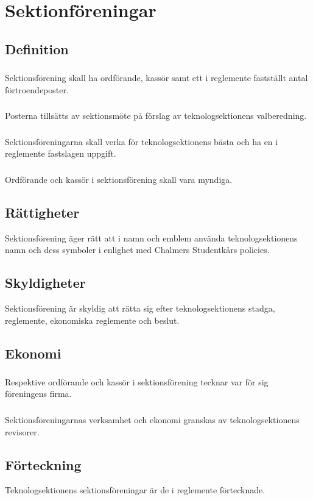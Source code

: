 \section{Sektionföreningar}
\subsection{Definition}
\subsubsection{}
Sektionsförening skall ha ordförande, kassör samt ett i reglemente fastställt antal förtroendeposter.
\subsubsection{}
Posterna tillsätts av sektionsmöte på förslag av teknologsektionens valberedning.
\subsubsection{}
Sektionsföreningarna skall verka för teknologsektionens bästa och ha en i reglemente fastslagen uppgift.
\subsubsection{}
Ordförande och kassör i sektionsförening skall vara myndiga.
\subsection{Rättigheter}
Sektionsförening äger rätt att i namn och emblem använda teknologsektionens namn och dess symboler i enlighet med Chalmers Studentkårs policies.
\subsection{Skyldigheter}
Sektionsförening är skyldig att rätta sig efter teknologsektionens stadga, reglemente, ekonomiska reglemente och beslut.
\subsection{Ekonomi}
\subsubsection{}
Respektive ordförande och kassör i sektionsförening tecknar var för sig föreningens firma.
\subsubsection{}
Sektionsföreningarnas verksamhet och ekonomi granskas av teknologsektionens revisorer.
\subsection{Förteckning}
Teknologsektionens sektionsföreningar är de i reglemente förtecknade.
